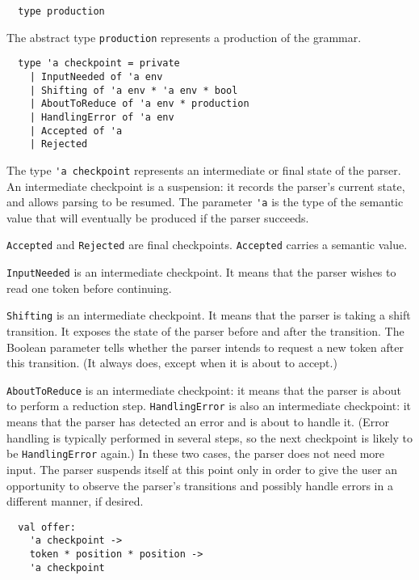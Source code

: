 \documentclass[onecolumn,11pt,nocopyrightspace,preprint]{sigplanconf}
\begin{document}

\begin{verbatim}
  type production
\end{verbatim}

The abstract type \verb+production+ represents a production of the grammar.


\begin{verbatim}
  type 'a checkpoint = private
    | InputNeeded of 'a env
    | Shifting of 'a env * 'a env * bool
    | AboutToReduce of 'a env * production
    | HandlingError of 'a env
    | Accepted of 'a
    | Rejected
\end{verbatim}

The type \verb+'a checkpoint+ represents an intermediate or
final state of the parser. An intermediate checkpoint is a suspension: it records
the parser's current state, and allows parsing to be resumed. The parameter
\verb+'a+ is the type of the semantic value that will eventually be produced
if the parser succeeds.

\verb+Accepted+ and \verb+Rejected+ are final checkpoints. \verb+Accepted+ carries
a semantic value.

\verb+InputNeeded+ is an intermediate checkpoint. It means that the parser wishes
to read one token before continuing.

\verb+Shifting+ is an intermediate checkpoint. It means that the parser is taking
a shift transition. It exposes the state of the parser before and after the
transition. The Boolean parameter tells whether the parser intends to request
a new token after this transition. (It always does, except when it is about to
accept.)

\verb+AboutToReduce+ is an intermediate checkpoint: it means that the parser is
about to perform a reduction step. \verb+HandlingError+ is also an
intermediate checkpoint: it means that the parser has detected an error and is
about to handle it. (Error handling is typically performed in several steps,
so the next checkpoint is likely to be \verb+HandlingError+ again.) In these two
cases, the parser does not need more input. The parser suspends itself at this
point only in order to give the user an opportunity to observe the parser's
transitions and possibly handle errors in a different manner, if desired.


\begin{verbatim}
  val offer:
    'a checkpoint ->
    token * position * position ->
    'a checkpoint
\end{verbatim}
\end{document}
